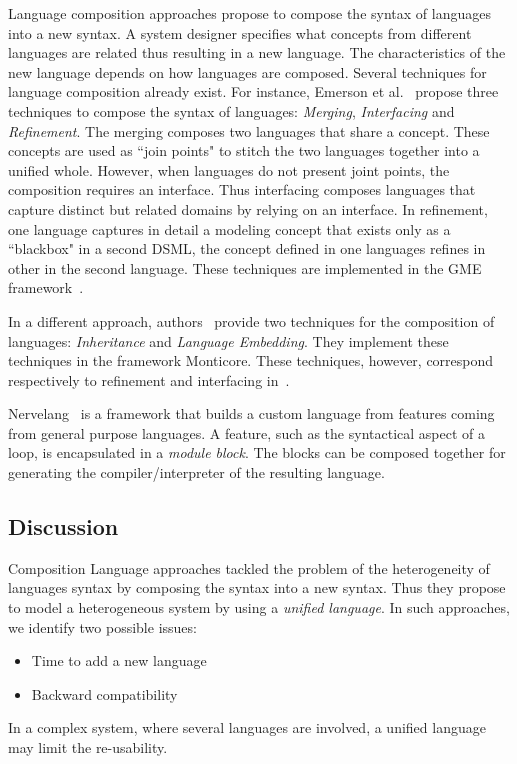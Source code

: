 Language composition approaches propose to compose the syntax of languages into a new syntax. A system designer specifies what concepts from different languages are related thus resulting in a new language. The characteristics of the new language depends on how languages are composed. Several techniques for language composition already exist. For instance, Emerson et al.~\cite{metamodelcompo} propose three techniques to compose the syntax of languages: \emph{Merging}, \emph{Interfacing} and \emph{Refinement}. The merging composes two languages that share a concept. These concepts are used as ``join points" to stitch the two languages together into a unified whole. However, when languages do not present joint points, the composition requires an interface. Thus interfacing composes languages that capture distinct but related domains by relying on an interface. In refinement, one language captures in detail a modeling concept that exists only as a ``blackbox" in a second DSML, \ie the concept defined in one languages refines in other in the second language. These techniques are implemented in the GME framework~\cite{metamodelcompo}. 
	
In a different approach, authors~\cite{monticore} provide two techniques for the composition of languages: \emph{Inheritance} and \emph{Language Embedding}. They implement these techniques in the framework Monticore. These techniques, however, correspond respectively to refinement and interfacing in~\cite{metamodelcompo}.
	
Nervelang~\cite{neverlang} is a framework that builds a custom language from features coming from general purpose languages. A feature, such as the syntactical aspect of a loop, is encapsulated in a \emph{module block}. The blocks can be composed together for generating the compiler/interpreter of the resulting language.  
	
	 	
 \subsection{Discussion}
Composition Language approaches tackled the problem of the heterogeneity of languages syntax by composing the syntax into a new syntax. Thus they propose to model a heterogeneous system by using a \emph{unified language}. In such approaches, we identify two possible issues:
						\begin{itemize}
							\item Time to add a new language
							\item Backward compatibility
						\end{itemize}			 	
In a complex system, where several languages are involved, a unified language may limit the re-usability.
			 	
